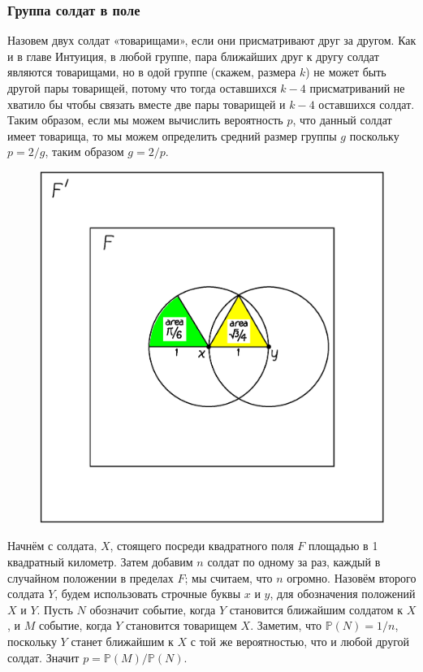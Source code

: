 \subsubsection*{Группа солдат в поле}

Назовем двух солдат «товарищами», если они присматривают друг за другом.
Как и в главе Интуиция, в любой группе, пара ближайших друг к другу солдат являются товарищами, но в одой группе (скажем, размера $k$) не может быть другой пары товарищей, потому что тогда оставшихся $k-4$ присматриваний не хватило бы чтобы связать вместе две пары товарищей и $k-4$ оставшихся солдат.
Таким образом, если мы можем вычислить вероятность $p$, что данный солдат имеет товарища, то мы можем определить средний размер группы $g$ поскольку $p = 2/g$, таким образом $g = 2/p$.

\begin{figure}[h!]
\centering
\includegraphics[scale=0.5]{Figs/Toughies/disks}
\end{figure}%

Начнём с солдата, $X$, стоящего посреди квадратного поля $F$ площадью в 1 квадратный километр.
Затем добавим $n$ солдат по одному за раз, каждый в случайном положении в пределах $F$; мы считаем, что $n$ огромно.
Назовём второго солдата $Y$, будем использовать строчные буквы $x$ и $y$, для обозначения положений $X$ и $Y$.
Пусть $N$ обозначит событие, когда $Y$ становится ближайшим солдатом к $X$, 
и $M$ событие, когда $Y$ становится товарищем $X$.
Заметим, что $\mathbb{P}(N)=1/n$, поскольку $Y$ станет ближайшим к $X$ с той же вероятностью, что и любой другой солдат.
Значит $p=\mathbb{P}(M)/\mathbb{P}(N)$.

